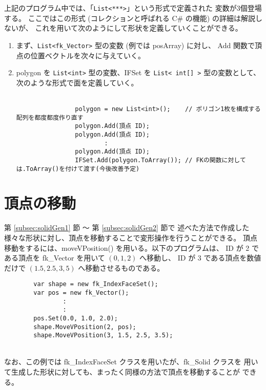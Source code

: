 上記のプログラム中では、「\verb+List<***>+」という形式で定義された
変数が3個登場する。
ここではこの形式 (コレクションと呼ばれる C\# の機能) の詳細は解説しないが、
これを用いて次のようにして形状を定義していくことができる。
\begin{enumerate}
 \item まず、\verb+List<fk_Vector>+ 型の変数 (例では posArray) に対し、
	Add 関数で頂点の位置ベクトルを次々に与えていく。

 \item polygon を \verb+List<int>+ 型の変数、IFSet を
	\verb+List< int[] >+ 型の変数として、
	次のような形式で面を定義していく。\\ ~ \\
	\begin{screen}
	\begin{verbatim}
                polygon = new List<int>();    // ポリゴン1枚を構成する配列を都度都度作り直す
                polygon.Add(頂点 ID);
                polygon.Add(頂点 ID);
                        :
                polygon.Add(頂点 ID);
                IFSet.Add(polygon.ToArray()); // FKの関数に対しては.ToArray()を付けて渡す(今後改善予定)
	\end{verbatim}
	\end{screen}
\end{enumerate}

\section{頂点の移動} \label{subsec:movevertex}
第 \ref{subsec:solidGen1} 節 〜 第 \ref{subsec:solidGen2} 節で
述べた方法で作成した
様々な形状に対し、頂点を移動することで変形操作を行うことができる。
頂点移動をするには、moveVPosition() を用いる。以下のプログラムは、
ID が 2 である頂点を fk\_Vector を用いて \((0, 1, 2)\) へ移動し、
ID が 3 である頂点を数値だけで \((1.5, 2.5, 3,5)\) へ移動させるものである。
\\
\begin{breakbox}
\begin{verbatim}
        var shape = new fk_IndexFaceSet();
        var pos = new fk_Vector();
                :
                :
        pos.Set(0.0, 1.0, 2.0);
        shape.MoveVPosition(2, pos);
        shape.MoveVPosition(3, 1.5, 2.5, 3.5);
\end{verbatim}
\end{breakbox}
~ \\
なお、この例では fk\_IndexFaceSet クラスを用いたが、fk\_Solid クラスを
用いて生成した形状に対しても、まったく同様の方法で頂点を移動することが
できる。

